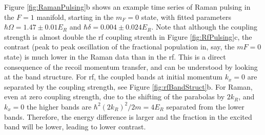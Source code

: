 Figure \ref{fig:RamanPulsing}b shows an example time series of Raman pulsing in the $F=1$ manifold, starting in the $m_F=0$ state, with fitted parameters  $\hbar\Omega=1.47\pm0.01 E_R$ and $\hbar\delta = 0.004\pm0.024 E_R$. Note that although the coupling strength is almost double the rf coupling strenth in Figure \ref{fig:RfPulsing}c, the contrast (peak to peak oscillation of the fractional population in, say, the $mF=0$ state) is much lower in the Raman data than in the rf. This is a direct consequence of the recoil momentum transfer, and can be understood by looking at the band structure. For rf, the coupled bands at initial momentum $k_x=0$ are separated by the coupling strength, see Figure \ref{fig:rfBandStruct}b. For Raman, even at zero coupling strength, due to the shifting of the parabolas by $2k_R$, and $k_x=0$ the higher bands are $\hbar^2(2k_R)^2/2m=4E_R$ separated from the lower bands. Therefore, the energy difference is larger and the fraction in the excited band will be lower, leading to lower contrast. 











